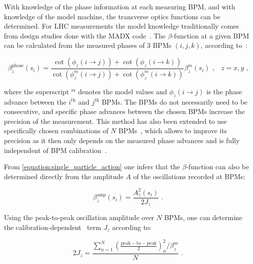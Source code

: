 With knowledge of the phase information at each measuring \gls{BPM}, and with knowledge of the model machine, the transverse optics functions can be determined.
For LHC measurements the model knowledge traditionally comes from design studies done with the \gls{MADX} code~\cite{CODE:MADX_guide}.
The \(\beta\)-function at a given BPM can be calculated from the measured phases of \num{3} BPMs \((i, j, k)\), according to~\cite{PHD:Castro,BOOK:Minty:Measurements_Control_Charged_Particle_Beams}:

\begin{equation}
  \beta_z^{\mathrm{phase}}(s_i) = \frac{\cot \left(\phi_z(i \rightarrow j)\right) + \cot \left(\phi_z(i \rightarrow k)\right)}{\cot \left(\phi^m_z(i \rightarrow j)\right) + \cot \left(\phi^m_z(i \rightarrow k)\right)} \beta^m_z(s_i)  \text{ ,} \quad z = x, y \text{ ,}
  \label{equation:beta_from_phase}
\end{equation}
\vspace{0.3mm}

\noindent
where the superscript \(^m\) denotes the model values and \(\phi_z(i \rightarrow j)\) is the phase advance between the \(i^{\mathrm{th}}\) and \(j^{\mathrm{th}}\) BPMs.
The BPMs do not necessarily need to be consecutive, and specific phase advances between the chosen BPMs increase the precision of the measurement.
This method has also been extended to use specifically chosen combinations of \(N\) BPMs~\cite{PRAB:Langner:N_BPM_Method,PRAB:Wegscheider:Analytical_N_BPM_Method}, which allows to improve its precision as it then only depends on the measured phase advances and is fully independent of BPM calibration~\cite{PRAB:Langner:Optics_Measurement_Algorithms_Error_Analysis_Proton_Energy_Frontier}.

From \cref{equation:single_particle_action} one infers that the \(\beta\)-function can also be determined directly from the amplitude \(A\) of the oscillations recorded at BPMs:

\begin{equation}
  \beta_z^{\mathrm{amp}}(s_i) = \frac{A_z^2(s_i)}{2 J_z} \text{ .}
  \label{equation:beta_from_amplitude}
\end{equation}

Using the peak-to-peak oscillation amplitude over \(N\) BPMs, one can determine the calibration-dependent~\cite{PRAB:GarciaTabares:BPM_Calibration} term \(J_z\) according to:

\begin{equation}
  2 J_z = \frac{\sum_{n=1}^{N} \left(\frac{\mathrm{peak-to-peak}}{2}\right)_{n}^2 / \beta^m_z}{N} \text{ .}
  \label{equation:J_from_peak_to_peak}
\end{equation}

